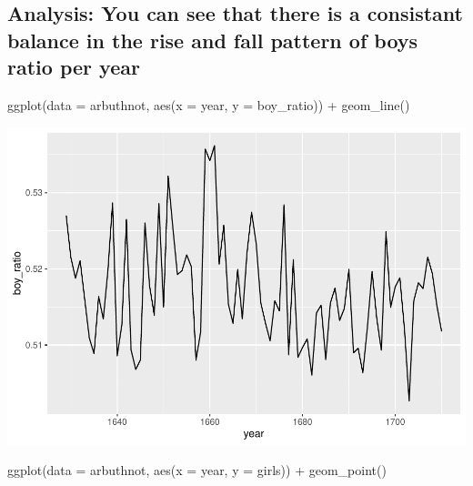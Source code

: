 \documentclass[
]{article}
\newenvironment{Shaded}{\begin{snugshade}}{\end{snugshade}}
\newcommand{\AttributeTok}[1]{\textcolor[rgb]{0.77,0.63,0.00}{#1}}
\newcommand{\FunctionTok}[1]{\textcolor[rgb]{0.00,0.00,0.00}{#1}}
\newcommand{\NormalTok}[1]{#1}
\newcommand{\SpecialCharTok}[1]{\textcolor[rgb]{0.00,0.00,0.00}{#1}}
\begin{document}
\hypertarget{analysis-you-can-see-that-there-is-a-consistant-balance-in-the-rise-and-fall-pattern-of-boys-ratio-per-year}{%
\subsection{Analysis: You can see that there is a consistant balance in
the rise and fall pattern of boys ratio per
year}\label{analysis-you-can-see-that-there-is-a-consistant-balance-in-the-rise-and-fall-pattern-of-boys-ratio-per-year}}

\begin{Shaded}
\begin{Highlighting}[]
\FunctionTok{ggplot}\NormalTok{(}\AttributeTok{data =}\NormalTok{ arbuthnot, }\FunctionTok{aes}\NormalTok{(}\AttributeTok{x =}\NormalTok{ year, }\AttributeTok{y =}\NormalTok{ boy\_ratio)) }\SpecialCharTok{+} 
  \FunctionTok{geom\_line}\NormalTok{()}
\end{Highlighting}
\end{Shaded}

\includegraphics{week1_practice_files/figure-latex/unnamed-chunk-14-1.pdf}

\begin{Shaded}
\begin{Highlighting}[]
\FunctionTok{ggplot}\NormalTok{(}\AttributeTok{data =}\NormalTok{ arbuthnot, }\FunctionTok{aes}\NormalTok{(}\AttributeTok{x =}\NormalTok{ year, }\AttributeTok{y =}\NormalTok{ girls)) }\SpecialCharTok{+} 
  \FunctionTok{geom\_point}\NormalTok{()}
\end{Highlighting}
\end{Shaded}
\end{document}
